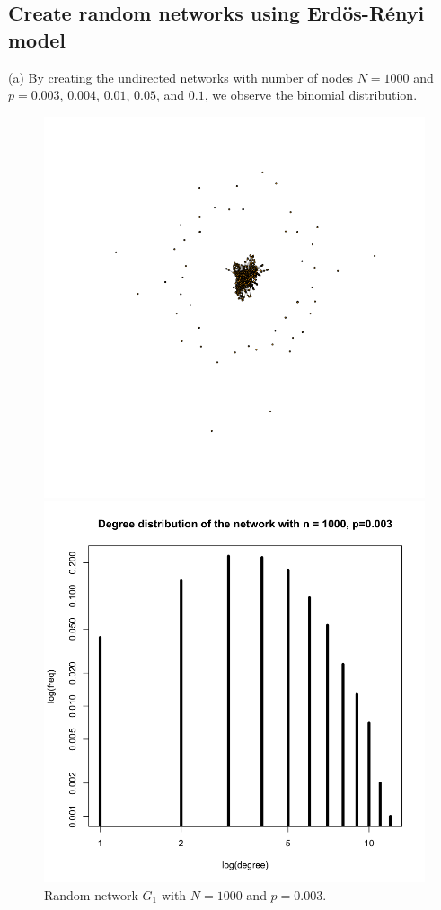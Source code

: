 \documentclass[draftcls,12pt,onecolumn]{IEEEtran}
\begin{document}
\subsection{Create random networks using Erd\"os-R\'enyi model}
(a) By creating the undirected networks with number of nodes $N=1000$ and $p=0.003$, $0.004$, $0.01$, $0.05$, and $0.1$, we observe the binomial distribution.
\begin{figure}[H]
\centering
\begin{minipage}[t]{0.48\textwidth}
\centering
\includegraphics[scale=0.2]{figures_part1_1/output_3_0.png}
\caption{Random network $G_1$ with $N=1000$ and $p=0.003$.}
\label{fig1}
\end{minipage}
\begin{minipage}[t]{0.48\textwidth}
\centering
\includegraphics[scale=0.2]{figures_part1_1/output_8_0.png}

\end{minipage}
\end{figure}
\end{document}
